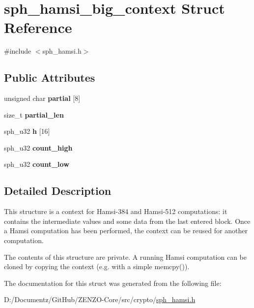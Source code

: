 \hypertarget{structsph__hamsi__big__context}{}\section{sph\+\_\+hamsi\+\_\+big\+\_\+context Struct Reference}
\label{structsph__hamsi__big__context}


{\ttfamily \#include $<$sph\+\_\+hamsi.\+h$>$}

\subsection*{Public Attributes}
\begin{DoxyCompactItemize}
\item 
\mbox{\label{structsph__hamsi__big__context_a46d565c14d01caf56b5691faf4abbe83}} 
unsigned char {\bfseries partial} \mbox{[}8\mbox{]}
\item 
\mbox{\label{structsph__hamsi__big__context_a0c4aa276101d29921ae02cb3ca43e8f6}} 
size\+\_\+t {\bfseries partial\+\_\+len}
\item 
\mbox{\label{structsph__hamsi__big__context_a91fd548b9edcd19bf53a3d5896a5d045}} 
sph\+\_\+u32 {\bfseries h} \mbox{[}16\mbox{]}
\item 
\mbox{\label{structsph__hamsi__big__context_a31d4c6979c53139e7743b8fd631da54f}} 
sph\+\_\+u32 {\bfseries count\+\_\+high}
\item 
\mbox{\label{structsph__hamsi__big__context_ac9f4f67420ac9bdfa7983d28ef6ccce7}} 
sph\+\_\+u32 {\bfseries count\+\_\+low}
\end{DoxyCompactItemize}


\subsection{Detailed Description}
This structure is a context for Hamsi-\/384 and Hamsi-\/512 computations\+: it contains the intermediate values and some data from the last entered block. Once a Hamsi computation has been performed, the context can be reused for another computation.

The contents of this structure are private. A running Hamsi computation can be cloned by copying the context (e.\+g. with a simple {\ttfamily memcpy()}). 

The documentation for this struct was generated from the following file\+:\begin{DoxyCompactItemize}
\item 
D\+:/\+Documentz/\+Git\+Hub/\+Z\+E\+N\+Z\+O-\/\+Core/src/crypto/\mbox{\hyperlink{sph__hamsi_8h}{sph\+\_\+hamsi.\+h}}\end{DoxyCompactItemize}

